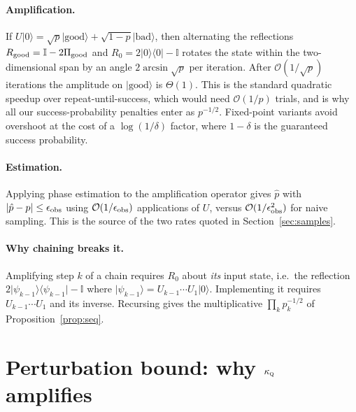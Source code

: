 \documentclass[11pt,a4paper]{article}
\theoremstyle{plain}
\theoremstyle{definition}
\theoremstyle{remark}
\newcommand{\Oh}{\mathcal{O}}
\newcommand{\ket}[1]{\lvert #1 \rangle}
\newcommand{\bra}[1]{\langle #1 \rvert}
\newcommand{\abs}[1]{\lvert #1 \rvert}
\newcommand{\Id}{\mathbb{I}}
\newcommand{\kQ}{\kappa_{\textsc{q}}}
\begin{document}
\paragraph{Amplification.}  If $U\ket{0}=\sqrt{p}\ket{\text{good}}
+\sqrt{1-p}\ket{\text{bad}}$, then alternating the reflections
$R_{\rm good}=\Id-2\Pi_{\rm good}$ and $R_0=2\ket{0}\!\bra{0}-\Id$ rotates the
state within the two-dimensional span by an angle $2\arcsin\sqrt{p}$ per
iteration.  After $\Oh(1/\sqrt{p})$ iterations the amplitude on
$\ket{\text{good}}$ is $\Theta(1)$.  This is the standard quadratic speedup over
repeat-until-success, which would need $\Oh(1/p)$ trials, and is why all our
success-probability penalties enter as $p^{-1/2}$.  Fixed-point variants
\cite{Yoder2014} avoid overshoot at the cost of a $\log(1/\delta)$ factor, where $1-\delta$ is the guaranteed success probability.

\paragraph{Estimation.}  Applying phase estimation to the amplification operator
gives $\hat p$ with $\abs{\hat p-p}\le\epsilon_{\rm obs}$ using
$\Oh(1/\epsilon_{\rm obs})$ applications of $U$, versus
$\Oh(1/\epsilon_{\rm obs}^{2})$ for naive sampling.  This is the source of the
two rates quoted in Section~\ref{sec:samples}.

\paragraph{Why chaining breaks it.}  Amplifying step $k$ of a chain requires
$R_0$ about \emph{its} input state, i.e.\ the reflection
$2\ket{\psi_{k-1}}\!\bra{\psi_{k-1}}-\Id$ where
$\ket{\psi_{k-1}}=U_{k-1}\cdots U_1\ket{0}$.  Implementing it requires
$U_{k-1}\cdots U_1$ and its inverse.  Recursing gives the multiplicative
$\prod_k p_k^{-1/2}$ of Proposition~\ref{prop:seq}.

\section{Perturbation bound: why $\kQ$ amplifies}
\label{app:pert}
\end{document}
